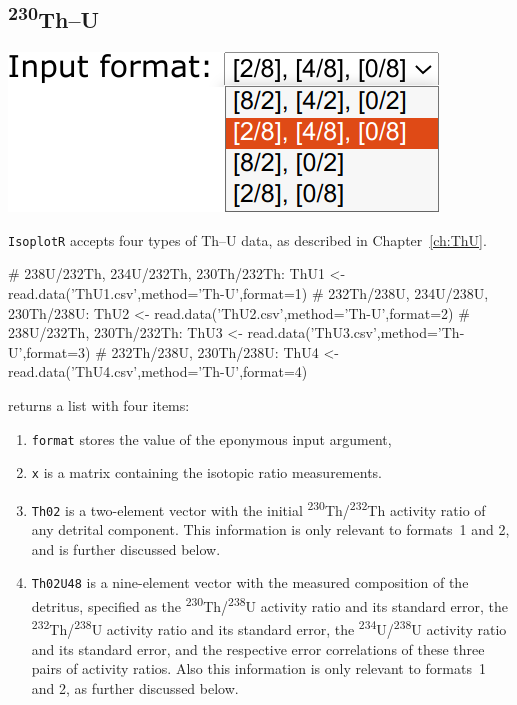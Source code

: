 \begin{refsection}

\chapter{\textsuperscript{230}Th--U}\label{ch:ThU-R}

\noindent\begin{minipage}[t]{.3\linewidth}
\strut\vspace*{-\baselineskip}\newline
\includegraphics[width=\linewidth]{../figures/ThUformats.png}
\end{minipage}
\begin{minipage}[t]{.7\linewidth}
\texttt{IsoplotR} accepts four types of Th--U data, as
  described in Chapter~\ref{ch:ThU}.
\end{minipage}

\begin{script}
# 238U/232Th, 234U/232Th, 230Th/232Th:
ThU1 <- read.data('ThU1.csv',method='Th-U',format=1)
# 232Th/238U, 234U/238U, 230Th/238U:
ThU2 <- read.data('ThU2.csv',method='Th-U',format=2)
# 238U/232Th, 230Th/232Th:
ThU3 <- read.data('ThU3.csv',method='Th-U',format=3)
# 232Th/238U, 230Th/238U:
ThU4 <- read.data('ThU4.csv',method='Th-U',format=4)
\end{script}

\noindent returns a list with four items:

\begin{enumerate}
\item\texttt{format} stores the value of the eponymous input argument,
\item\texttt{x} is a matrix containing the isotopic ratio measurements.
\item\texttt{Th02} is a two-element vector with the initial
  \textsuperscript{230}Th/\textsuperscript{232}Th activity ratio of
  any detrital component. This information is only relevant to
  formats~1 and 2, and is further discussed below.
\item\texttt{Th02U48} is a nine-element vector with the measured
  composition of the detritus, specified as the
  \textsuperscript{230}Th/\textsuperscript{238}U activity ratio and
  its standard error, the
  \textsuperscript{232}Th/\textsuperscript{238}U activity ratio and
  its standard error, the
  \textsuperscript{234}U/\textsuperscript{238}U activity ratio and its
  standard error, and the respective error correlations of these three
  pairs of activity ratios. Also this information is only relevant to
  formats~1 and 2, as further discussed below.
\end{enumerate}


\end{refsection}

